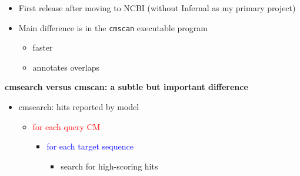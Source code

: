 \documentclass[landscape]{slides}
\begin{document}
\begin{slide}
\begin{slide}
\medskip
\begin{itemize}
\item First release after moving to NCBI (without Infernal as my primary project)
\item Main difference is in the \texttt{cmscan} executable program 
\begin{itemize}
  \item faster
  \item annotates overlaps
\end{itemize}
\end{itemize}


\vfill
\end{slide}
\begin{slide}
\begin{center}
\textbf{cmsearch versus cmscan: a subtle but important difference}
\end{center}

\scriptsize
\begin{itemize}
\item cmsearch: hits reported by model
  \begin{itemize}
  \item \textcolor{red}{for each query} \textcolor{red}{CM}
    \begin{itemize}
    \item \textcolor{blue}{for each target} \textcolor{blue}{sequence}
      \begin{itemize}
      \item search for high-scoring hits
      \end{itemize}
    \end{itemize}
  \end{itemize}
\end{itemize}


\end{slide}
\end{slide}
\end{document}
